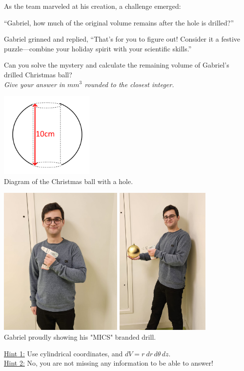 \documentclass[a4paper, top=10mm]{article}
\begin{document}
	As the team marveled at his creation, a challenge emerged:
	
	“Gabriel, how much of the original volume remains after the hole is drilled?”
	
	Gabriel grinned and replied, “That’s for you to figure out! Consider it a festive puzzle—combine your holiday spirit with your scientific skills.”
	
	Can you solve the mystery and calculate the remaining volume of Gabriel’s drilled Christmas ball?\\
	\textit{Give your answer in $mm^3$ rounded to the closest integer.}
	
	\begin{center}
		\includegraphics[height=120pt]{01xmas_pearl.png}\\
		Diagram of the Christmas ball with a hole.
	\end{center}
	
	\begin{center}
		\includegraphics[height=210pt]{01gabriel_bis.png}
		\includegraphics[height=210pt]{01gabriel.png}\\
		Gabriel proudly showing his "MICS" branded drill.
	\end{center}
	
	\underline{Hint 1:} Use cylindrical coordinates, and $dV = r\ dr\, d\theta\, dz$.\\
	
	\underline{Hint 2:} No, you are not missing any information to be able to answer!
	
	
\end{document}
